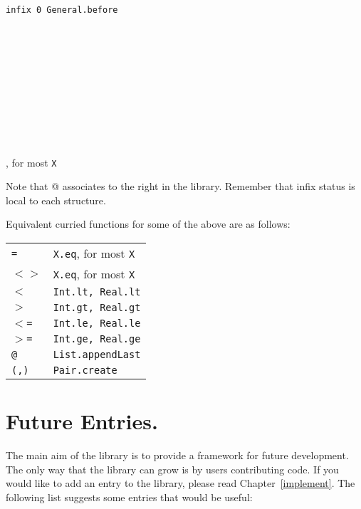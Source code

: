 \begin{tabbing}
\hspace{0.3in}\={\tt infix  0 General.before}\\
\\
\\
\\
\>\hspace{0.5in}{\tt Combinator.oo  Combinator.co
	Combinator.fby  Combinator.over}\\
\\
\\
\\
\\
\\
\\
, for most {\tt X}
\end{tabbing}

Note that @ associates to the right in the library.
Remember that infix status is local to each structure.

Equivalent curried functions for some of the above are as follows:

\begin{tabular}{ll}
  {\tt =}   &   {\tt X.eq}, for most {\tt X}\\
  {\tt $<>$}  &   {\tt X.eq}, for most {\tt X}\\
  {\tt $<$}   &   {\tt Int.lt, Real.lt}\\
  {\tt $>$}   &   {\tt Int.gt, Real.gt}\\
  {\tt $<$=}  &   {\tt Int.le, Real.le}\\
  {\tt $>$=}  &   {\tt Int.ge, Real.ge}\\
  {\tt @}   &   {\tt List.appendLast}\\
  {\tt (,)} &   {\tt Pair.create}
\end{tabular}


\section{Future Entries.}

The main aim of the library is to provide a framework for future
development.  The only way that the library can grow is by users
contributing code. 
If you would like to add an entry to the library, please read
Chapter~\ref{implement}.
The following list suggests some entries that would be useful:

